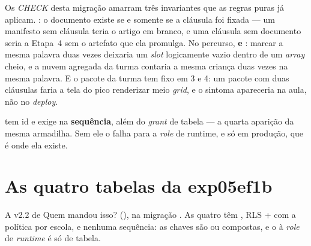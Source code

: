 \begin{regra}
Os \emph{CHECK} desta migração amarram três invariantes que as regras puras já
aplicam. : o
documento existe se e somente se a cláusula foi fixada --- um manifesto sem
cláusula teria o artigo em branco, e uma cláusula sem documento seria a Etapa~4
sem o artefato que ela promulga. No percurso,
 \textbf{e}
: marcar a mesma palavra duas vezes deixaria um
\emph{slot} logicamente vazio dentro de um \emph{array} cheio, e a nuvem
agregada da turma contaria a mesma criança duas vezes na mesma palavra. E o
pacote da turma tem  fixo em 3 e 4: um pacote com duas
cláusulas faria a tela do pico renderizar meio \emph{grid}, e o sintoma
apareceria na aula, não no \emph{deploy}.
\end{regra}

\begin{atencao}
 tem id  e exige  na
\textbf{sequência}, além do \emph{grant} de tabela --- a quarta aparição da
mesma armadilha. Sem ele o  falha para a \emph{role} de runtime, e só
em produção, que é onde ela existe.
\end{atencao}


\section{As quatro tabelas da exp05ef1b}
\label{sec:tabelas-exp05ef1b}

A v2.2 de Quem mandou isso? (), na migração
. As quatro têm
, RLS  +  com a política por escola, e
nenhuma sequência: as chaves são  ou compostas, e o  à
\emph{role} de \emph{runtime} é só de tabela.

